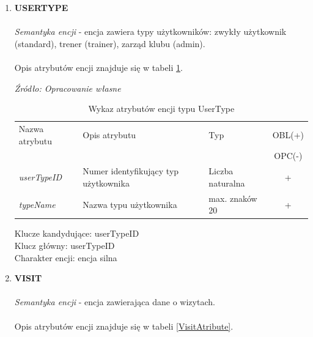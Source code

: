 \documentclass[12pt,twoside]{report}
\begin{document}
\begin{enumerate}[start=10,label={\bfseries ENC$\backslash$\arabic*}]
\item \textbf{USERTYPE} \\ \\
\textit{Semantyka encji} - encja zawiera typy użytkowników: zwykły użytkownik (standard), trener (trainer), zarząd klubu (admin).
			\\ \\
Opis atrybutów encji znajduje się w tabeli \ref{UserTypeAtribute}.

\begin{table}[H]
	\caption{Wykaz atrybutów encji typu UserType }
	\textit{Źródło: Opracowanie własne}
	\label{UserTypeAtribute}
	\centering
	\begin{tabular}{|l|l|l|c|}			
		\hline
		Nazwa atrybutu & Opis atrybutu & Typ & OBL(+) \\
		& & &  OPC(-) \\
		\hline
		\textit{userTypeID} & Numer identyfikujący typ użytkownika & Liczba naturalna & + \\
		\hline
		\textit{typeName} & Nazwa typu użytkownika & max. znaków 20 & + \\
		\hline
	\end{tabular}
\end{table}
Klucze kandydujące: userTypeID \\
Klucz główny: userTypeID \\
Charakter encji: encja silna \\

\item \textbf{VISIT}\\ \\
\textit{Semantyka encji} - encja zawierająca dane o wizytach. 			
\\ \\
Opis atrybutów encji znajduje się w tabeli \ref{VisitAtribute}.


\end{enumerate}
\end{document}
